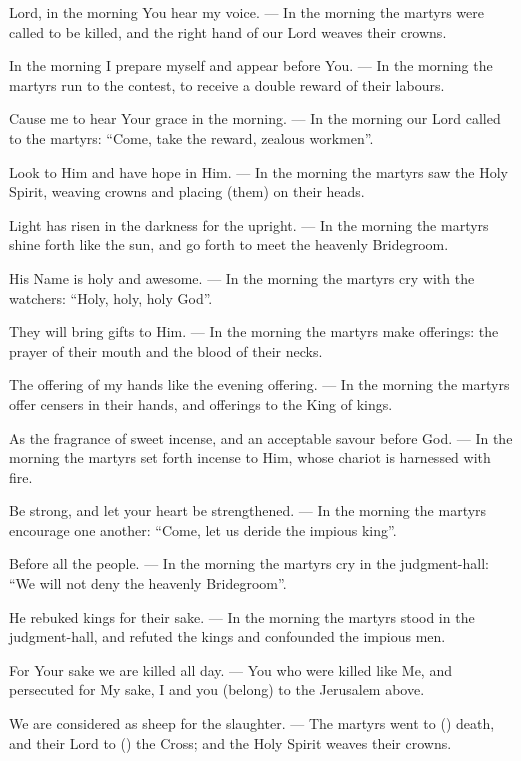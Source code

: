 \documentclass[12pt,twoside,a5paper]{article}
\begin{document}
\begin{halfparskip}
  Lord, in the morning You hear my voice. --- In the morning the martyrs were called to be killed, and the right hand of our Lord weaves their crowns.

  In the morning I prepare myself and appear before You. --- In the morning the martyrs run to the contest, to receive a double reward of their labours.

  Cause me to hear Your grace in the morning. --- In the morning our Lord called to the martyrs: ``Come, take the reward, zealous workmen''.

  Look to Him and have hope in Him. --- In the morning the martyrs saw the Holy Spirit, weaving crowns and placing (them) on their heads.

  Light has risen in the darkness for the upright. --- In the morning the martyrs shine forth like the sun, and go forth to meet the heavenly Bridegroom.

  His Name is holy and awesome. --- In the morning the martyrs cry with the watchers: ``Holy, holy, holy God''.

  They will bring gifts to Him. --- In the morning the martyrs make offerings: the prayer of their mouth and the blood of their necks.

  The offering of my hands like the evening offering. --- In the morning the martyrs offer censers in their hands, and offerings to the King of kings.

  As the fragrance of sweet incense, and an acceptable savour before God. --- In the morning the martyrs set forth incense to Him, whose chariot is harnessed with fire.

  Be strong, and let your heart be strengthened. --- In the morning the martyrs encourage one another: ``Come, let us deride the impious king''.

  Before all the people. --- In the morning the martyrs cry in the judgment-hall: ``We will not deny the heavenly Bridegroom''.

  He rebuked kings for their sake. --- In the morning the martyrs stood in the judgment-hall, and refuted the kings and confounded the impious men.

  For Your sake we are killed all day. --- You who were killed like Me, and persecuted for My sake, I and you (belong) to the Jerusalem above.

  We are considered as sheep for the slaughter. --- The martyrs went to () death, and their Lord to () the Cross; and the Holy Spirit weaves their crowns.


\end{halfparskip}
\end{document}

